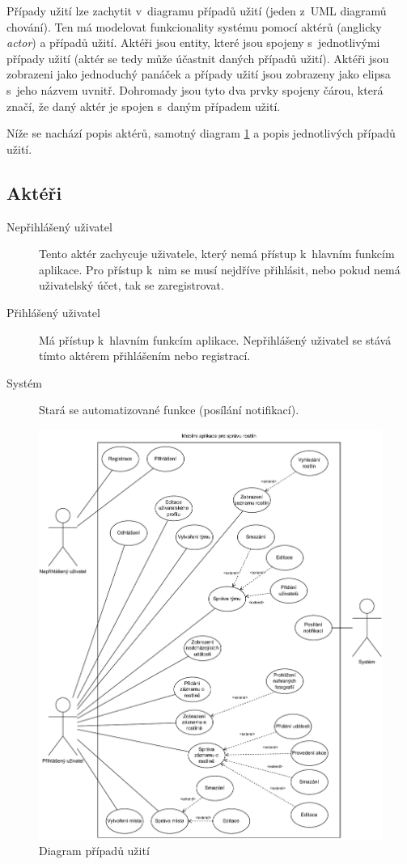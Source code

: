 \documentclass[thesis=M,czech]{FITthesis}[2019/12/23]
\begin{document}
Případy užití lze zachytit v~diagramu případů užití (jeden z~UML diagramů chování). Ten má modelovat funkcionality systému pomocí aktérů (anglicky \textit{actor}) a případů užití. Aktéři jsou entity, které jsou spojeny s~jednotlivými případy užití (aktér se tedy může účastnit daných případů užití). Aktéři jsou zobrazeni jako jednoduchý panáček a případy užití jsou zobrazeny jako elipsa s~jeho názvem uvnitř. Dohromady jsou tyto dva prvky spojeny čárou, která značí, že daný aktér je spojen s~daným případem užití. \cite{use-cases-1}

Níže se nachází popis aktérů, samotný diagram \ref{dia:usecases} a popis jednotlivých případů užití.

\subsection*{Aktéři}
\begin{description}
    \item[Nepřihlášený uživatel] Tento aktér zachycuje uživatele, který nemá přístup k~hlavním funkcím aplikace. Pro přístup k~nim se musí nejdříve přihlásit, nebo pokud nemá uživatelský účet, tak se zaregistrovat.
    \item[Přihlášený uživatel] Má přístup k~hlavním funkcím aplikace. Nepřihlášený uživatel se stává tímto aktérem přihlášením nebo registrací.
    \item[Systém] Stará se automatizované funkce (posílání notifikací).
\end{description}

\begin{figure}
	\centering
	\includegraphics[width=1\linewidth]{images/use_case_diagram.pdf}
  	\caption{Diagram případů užití}
  	\label{dia:usecases}
\end{figure}
\end{document}
